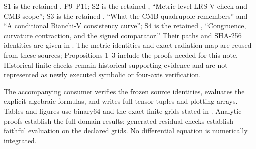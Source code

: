 \documentclass[aps,prd,reprint,onecolumn,nofootinbib]{revtex4-2}
\begin{document}
S1 is the retained , P9--P11; S2 is the retained , ``Metric-level LRS V check and CMB scope''; S3 is the retained , ``What the CMB quadrupole remembers'' and ``A conditional Bianchi-V consistency curve''; S4 is the retained , ``Congruence, curvature contraction, and the signed comparator.'' Their paths and SHA-256 identities are given in . The metric identities and exact radiation map are reused from these sources; Propositions 1--3 include the proofs needed for this note. Historical finite checks remain historical supporting evidence and are not represented as newly executed symbolic or four-axis verification.

The accompanying consumer verifies the frozen source identities, evaluates the explicit algebraic formulas, and writes full tensor tuples and plotting arrays. Tables and figures use binary64 and the exact finite grids stated in . Analytic proofs establish the full-domain results; generated residual checks establish faithful evaluation on the declared grids. No differential equation is numerically integrated.
\end{document}
